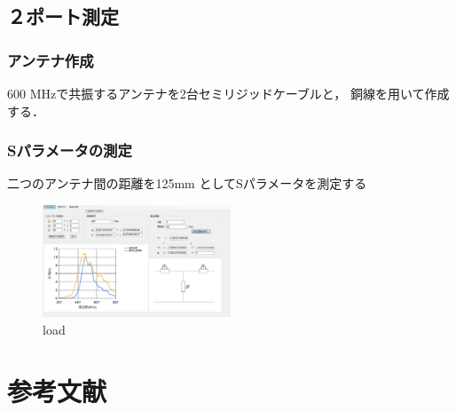 \documentclass[a4paper,11pt,xelatex,ja=standard]{bxjsarticle}
\begin{document}
    \subsection{２ポート測定}
        \subsubsection{アンテナ作成}
            600 MHzで共振するアンテナを2台セミリジッドケーブルと， 銅線を用いて作成する．
        \subsubsection{Sパラメータの測定}
            二つのアンテナ間の距離を125mm としてSパラメータを測定する
            \begin{figure}[H]
                \centering
                \includegraphics[width=0.5\textwidth]{./img/24-3/4.png}
                \caption{load}
            \end{figure}


\section{参考文献}
\end{document}
